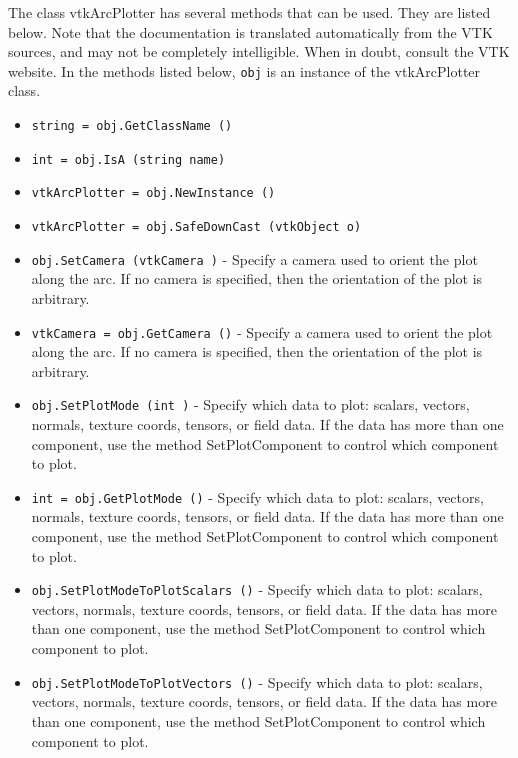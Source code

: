 The class vtkArcPlotter has several methods that can be used.
  They are listed below.
Note that the documentation is translated automatically from the VTK sources,
and may not be completely intelligible.  When in doubt, consult the VTK website.
In the methods listed below, \verb|obj| is an instance of the vtkArcPlotter class.
\begin{itemize}
\item  \verb|string = obj.GetClassName ()|

\item  \verb|int = obj.IsA (string name)|

\item  \verb|vtkArcPlotter = obj.NewInstance ()|

\item  \verb|vtkArcPlotter = obj.SafeDownCast (vtkObject o)|

\item  \verb|obj.SetCamera (vtkCamera )| -  Specify a camera used to orient the plot along the arc. If no camera
 is specified, then the orientation of the plot is arbitrary.

\item  \verb|vtkCamera = obj.GetCamera ()| -  Specify a camera used to orient the plot along the arc. If no camera
 is specified, then the orientation of the plot is arbitrary.

\item  \verb|obj.SetPlotMode (int )| -  Specify which data to plot: scalars, vectors, normals, texture coords,
 tensors, or field data. If the data has more than one component, use
 the method SetPlotComponent to control which component to plot.

\item  \verb|int = obj.GetPlotMode ()| -  Specify which data to plot: scalars, vectors, normals, texture coords,
 tensors, or field data. If the data has more than one component, use
 the method SetPlotComponent to control which component to plot.

\item  \verb|obj.SetPlotModeToPlotScalars ()| -  Specify which data to plot: scalars, vectors, normals, texture coords,
 tensors, or field data. If the data has more than one component, use
 the method SetPlotComponent to control which component to plot.

\item  \verb|obj.SetPlotModeToPlotVectors ()| -  Specify which data to plot: scalars, vectors, normals, texture coords,
 tensors, or field data. If the data has more than one component, use
 the method SetPlotComponent to control which component to plot.


\end{itemize}
